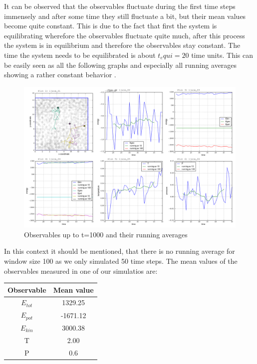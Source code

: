 \documentclass[12pt,a4paper]{scrartcl}
\begin{document}
It can be observed that the observables fluctuate during the first time steps immensely and after some time they still fluctuate a bit, but their mean values become quite constant. This is due to the fact that first the system is equilibrating wherefore the observables fluctuate quite much, after this process the system is in equilibrium and therefore the observables stay constant.
The time the system needs to be equilibrated is about $t_equi=20$ time units.
This can be easily seen as all the following graphs and especially all running averages showing a rather constant behavior .
\begin{figure}[H]
\centering
\includegraphics[width=16.0cm]{../plots/Tequi.png}
\caption{Observables up to t=1000 and their running averages}
\label{fig:running averages}
\end{figure}

In this context it should be mentioned, that there is no running average for window size 100 as we only simulated 50 time steps.
The mean values of the observables measured in one of our simulatios are:\newline
\\
\begin{center}
\begin{tabular}{cc}
\toprule
Observable & Mean value\\
\midrule
$E_{tot}$&1329.25\\
$E_{pot}$&-1671.12\\
$E_{kin}$&3000.38\\
T&2.00\\
P&0.6\\
\bottomrule

\end{tabular}
\end{center}
\newpage
\end{document}

